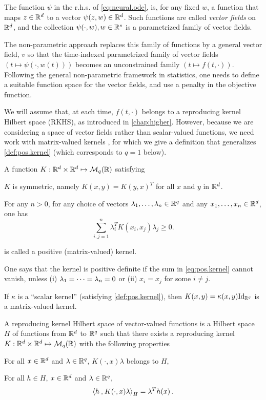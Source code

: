 \bigskip
The function $\psi$ in the r.h.s. of \cref{eq:neural.ode}, is, for any fixed $w$, a function that maps $z\in {\mathbb{R}}^d$ to a vector $\psi(z, w)\in {\mathbb{R}}^d$. Such functions are called {\em vector fields} on ${\mathbb{R}}^d$, and the collection $\psi(\cdot, w), w\in {\mathbb{R}}^s$ is a parametrized family of vector fields.

The non-parametric approach replaces this family of functions by a general vector  field, $v$ so that the time-indexed parametrized family of vector fields $(t \mapsto \psi(\cdot, w(t)))$ becomes an unconstrained family $(t \mapsto f(t, \cdot))$. Following the general non-parametric framework in statistics, one needs to define a suitable function space for the vector fields, and use a penalty in the objective function.

We will assume that, at each time, $f(t, \cdot)$ belongs to a reproducing kernel Hilbert space (RKHS), as introduced in \cref{chap:higher}. However, because we are considering a space of vector fields rather than scalar-valued functions, we need work with matrix-valued kernels \cite{alvarez2012kernels}, for which we give a definition that generalizes \cref{def:pos.kernel} (which corresponds to $q=1$ below). 
\begin{definition}
\label{def:pos.kernel.op}
A function $K: {\mathbb{R}}^d \times{\mathbb{R}}^d \mapsto {\mathcal M}_q({\mathbb{R}})$ satisfying 
\begin{enumerate}[label={[K\arabic*-vec]}, wide=0pt]
\item $K$ is symmetric, namely $K(x,y) = K(y,x)^T$ for all $x$ and $y$ in ${\mathbb{R}}^d$. 
\item For any $n>0$, for any choice of vectors $\lambda_1, \dots, \lambda_n\in {\mathbb{R}}^q$ and any $x_1, \ldots, x_n \in {\mathbb{R}}^d$, one has
\begin{equation}
\label{eq:pos.kernel.op}
\sum_{i,j=1}^n \lambda_i^T K(x_i, x_j) \lambda_j \geq 0.
\end{equation}
\end{enumerate}
is called a positive (matrix-valued) kernel.

One says that
the kernel is positive definite if the sum in \cref{eq:pos.kernel} cannot vanish, unless (i) $\lambda_1 = \cdots = \lambda_n=0$ or (ii) $x_i=x_j$ for some $i\neq j$.
\end{definition}
If $\kappa$ is a ``scalar kernel'' (satisfying \cref{def:pos.kernel}), then $K(x,y) = \kappa(x,y)\Id[q]$ is a matrix-valued kernel. 

A reproducing kernel Hilbert space of vector-valued functions is a Hilbert space $H$ of functions from ${\mathbb{R}}^d$ to ${\mathbb{R}}^q$ such that there exists a reproducing kernel $K: {\mathbb{R}}^d \times{\mathbb{R}}^d \mapsto {\mathcal M}_q({\mathbb{R}})$ with the following properties
\begin{enumerate}[label={[RKHS\arabic*]}, wide=0pt]
\item For all $x\in {\mathbb{R}}^d$ and $\lambda\in {\mathbb{R}}^q$, $K(\cdot, x)\lambda$ belongs to $H$,
\item For all $h\in H$, $x\in {\mathbb{R}}^d$ and $\lambda\in {\mathbb{R}}^q$, 
\[
{\langle {h}\mathbin{,} {K(\cdot, x)\lambda}\rangle}_H = \lambda^T h(x)\,.
\] 
\end{enumerate}

